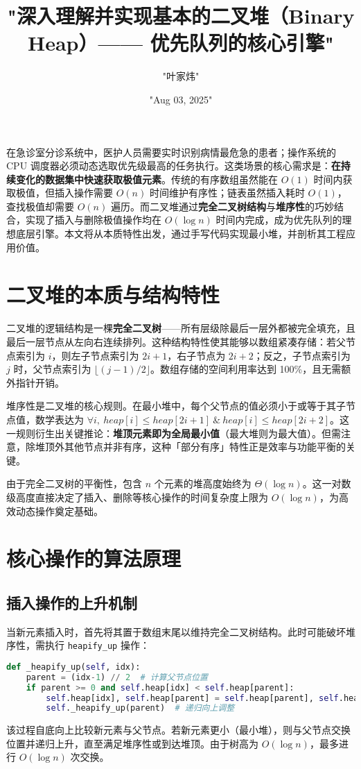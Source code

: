 \title{"深入理解并实现基本的二叉堆（Binary Heap）—— 优先队列的核心引擎"}
\author{"叶家炜"}
\date{"Aug 03, 2025"}
\maketitle
在急诊室分诊系统中，医护人员需要实时识别病情最危急的患者；操作系统的 CPU 调度器必须动态选取优先级最高的任务执行。这类场景的核心需求是：\textbf{在持续变化的数据集中快速获取极值元素}。传统的有序数组虽然能在 $O(1)$ 时间内获取极值，但插入操作需要 $O(n)$ 时间维护有序性；链表虽然插入耗时 $O(1)$，查找极值却需要 $O(n)$ 遍历。而二叉堆通过\textbf{完全二叉树结构}与\textbf{堆序性}的巧妙结合，实现了插入与删除极值操作均在 $O(\log n)$ 时间内完成，成为优先队列的理想底层引擎。本文将从本质特性出发，通过手写代码实现最小堆，并剖析其工程应用价值。\par
\chapter{二叉堆的本质与结构特性}
二叉堆的逻辑结构是一棵\textbf{完全二叉树}——所有层级除最后一层外都被完全填充，且最后一层节点从左向右连续排列。这种结构特性使其能够以数组紧凑存储：若父节点索引为 $i$，则左子节点索引为 $2i+1$，右子节点为 $2i+2$；反之，子节点索引为 $j$ 时，父节点索引为 $\lfloor (j-1)/2 \rfloor$。数组存储的空间利用率达到 100\%{}，且无需额外指针开销。\par
堆序性是二叉堆的核心规则。在最小堆中，每个父节点的值必须小于或等于其子节点值，数学表达为 $\forall i,\ heap[i] \leq heap[2i+1]\ \&\ heap[i] \leq heap[2i+2]$。这一规则衍生出关键推论：\textbf{堆顶元素即为全局最小值}（最大堆则为最大值）。但需注意，除堆顶外其他节点并非有序，这种「部分有序」特性正是效率与功能平衡的关键。\par
由于完全二叉树的平衡性，包含 $n$ 个元素的堆高度始终为 $\Theta(\log n)$。这一对数级高度直接决定了插入、删除等核心操作的时间复杂度上限为 $O(\log n)$，为高效动态操作奠定基础。\par
\chapter{核心操作的算法原理}
\section{插入操作的上升机制}
当新元素插入时，首先将其置于数组末尾以维持完全二叉树结构。此时可能破坏堆序性，需执行 \texttt{heapify\_{}up} 操作：\par
\begin{lstlisting}[language=python]
def _heapify_up(self, idx):
    parent = (idx-1) // 2  # 计算父节点位置
    if parent >= 0 and self.heap[idx] < self.heap[parent]:
        self.heap[idx], self.heap[parent] = self.heap[parent], self.heap[idx]  # 交换位置
        self._heapify_up(parent)  # 递归向上调整
\end{lstlisting}
该过程自底向上比较新元素与父节点。若新元素更小（最小堆），则与父节点交换位置并递归上升，直至满足堆序性或到达堆顶。由于树高为 $O(\log n)$，最多进行 $O(\log n)$ 次交换。\par
